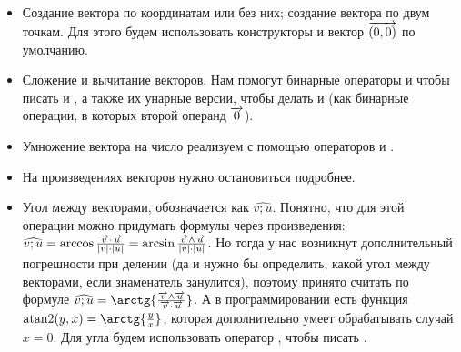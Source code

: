 \begin{itemize}
    \item Создание вектора по координатам или без них; создание вектора по двум точкам. Для этого будем использовать конструкторы и вектор $\overrightarrow{(0, 0)}$ по умолчанию.
    \item Сложение и вычитание векторов. Нам помогут бинарные операторы \lcpp{+} и \lcpp{-} чтобы писать  и , а также их унарные версии, чтобы делать  и  (как бинарные операции, в которых второй операнд $\overrightarrow{0}$).
    \item Умножение вектора на число реализуем с помощью операторов \lcpp{*} и \lcpp{/}.
    \item На произведениях векторов нужно остановиться подробнее.
    \item Угол между векторами, обозначается как $\widehat{v;u}$. Понятно, что для этой операции можно придумать формулы через произведения: $\widehat{v;u} = \arccos{ \frac{\overrightarrow{v} \cdot \overrightarrow{u}}{|v| \cdot |u|} } = \arcsin{ \frac{\overrightarrow{v} \wedge \overrightarrow{u}}{|v| \cdot |u|} }$. Но тогда у нас возникнут дополнительный погрешности при делении (да и нужно бы определить, какой угол между векторами, если знаменатель занулится), поэтому принято считать по формуле $\widehat{v;u} = \arctg{ \frac{\v{v} \wedge \v{u}}{\v{v} \cdot \v{u}} }$. А в программировании есть функция $\atantwo(y, x) = \arctg{\frac{y}{x}}$, которая дополнительно умеет обрабатывать случай $x = 0$. Для угла будем использовать оператор \lcpp{^}, чтобы писать .

\end{itemize}

